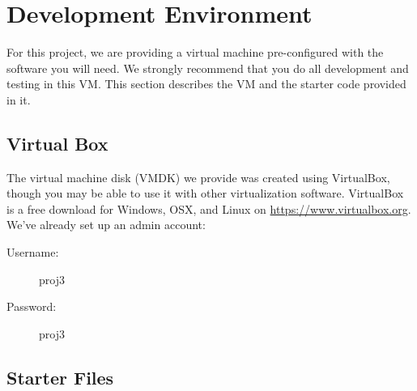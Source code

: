 \documentclass{article}
\begin{document}
\section{Development Environment}
\label{sec:starter}

For this project, we are providing a virtual machine pre-configured with the
software you will need. We strongly recommend that you do all development and
testing in this VM. This section describes the VM and the starter code provided
in it.

\subsection{Virtual Box}

The virtual machine disk (VMDK) we provide was created using VirtualBox, though
you may be able to use it with other virtualization software. VirtualBox is a
free download for Windows, OSX, and Linux on \url{https://www.virtualbox.org}.
We've already set up an admin account:
\begin{description}
	\item[Username:] proj3
	\item[Password:] proj3
\end{description}


\subsection{Starter Files}
\label{sec:starter-files}
\end{document}
